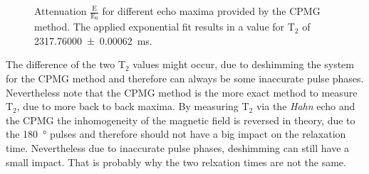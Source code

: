 \begin{figure}[H]
    \centering
    
    \caption[Attenuation $\frac{\text{E}}{\text{E}_0}$ for different echo maxima provided by the CPMG method.]{Attenuation $\frac{\text{E}}{\text{E}_0}$ for different echo maxima provided by the CPMG method. The applied exponential fit results in a value for T$_2$ of \SI{2317.76000 \pm 0.00062}{\milli \second}.}
    \label{fig:CPMG}
\end{figure}

The difference of the two T$_2$ values might occur, due to deshimming the system for the CPMG method and therefore can always be some inaccurate pulse phases. Nevertheless note that the CPMG method is the more exact method to measure T$_2$, due to more back to back maxima. By measuring T$_2$ via the \textit{Hahn} echo and the CPMG the inhomogeneity of the magnetic field is reversed in theory, due to the \SI{180}{\degree} pulses and therefore should not have a big impact on the relaxation time. Nevertheless due to inaccurate pulse phases, deshimming can still have a small impact. That is probably why the two relxation times are not the same.